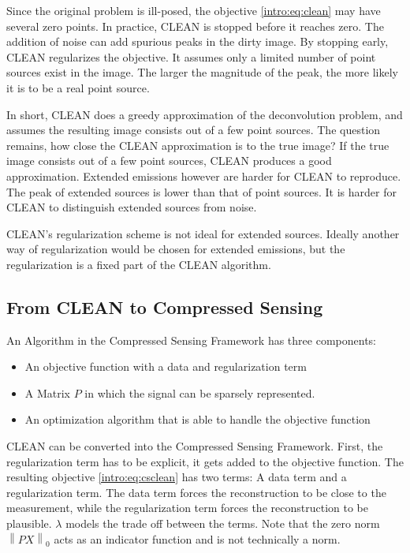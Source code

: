 Since the original problem is ill-posed, the objective \eqref{intro:eq:clean} may have several zero points. In practice, CLEAN is stopped before it reaches zero. The addition of noise can add spurious peaks in the dirty image. By stopping early, CLEAN regularizes the objective. It assumes only a limited number of point sources exist in the image. The larger the magnitude of the peak, the more likely it is to be a real point source.

In short, CLEAN does a greedy approximation of the deconvolution problem, and assumes the resulting image consists out of a few point sources. The question remains, how close the CLEAN approximation is to the true image? If the true image consists out of a few point sources, CLEAN produces a good approximation. Extended emissions however are harder for CLEAN to reproduce. The peak of extended sources is lower than that of point sources. It is harder for CLEAN to distinguish extended sources from noise.

CLEAN's regularization scheme is not ideal for extended sources. Ideally another way of regularization would be chosen for extended emissions, but the regularization is a fixed part of the CLEAN algorithm.


\subsection{From CLEAN to Compressed Sensing}
An Algorithm in the Compressed Sensing Framework has three components:
\begin{itemize}
	\item An objective function with a data and regularization term
	\item A Matrix $P$ in which the signal can be sparsely represented.
	\item An optimization algorithm that is able to handle the objective function
\end{itemize}

CLEAN can be converted into the Compressed Sensing Framework. First, the regularization term has to be explicit, it gets added to the objective function. The resulting objective \eqref{intro:eq:csclean} has two terms: A data term and a regularization term. The data term forces the reconstruction to be close to the measurement, while the regularization term forces the reconstruction to be plausible. $\lambda$ models the trade off between the terms. Note that the zero norm $\left \| PX \right \|_0$ acts as an indicator function and is not technically a norm.

